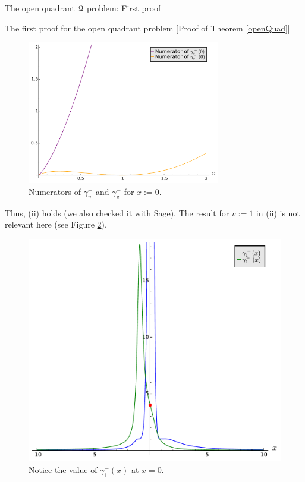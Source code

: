 \documentclass[11pt, a4paper, english, twoside, notitlepage, openright]{report}
\begin{document}
\begin{chapter}{The open quadrant $\mathcal{Q}$ problem: First proof}
\begin{section}{The first proof for the open quadrant problem} [Proof of Theorem \ref{openQuad}]
\begin{figure}[h]
\centering
\includegraphics[width=0.75\textwidth]{plots/ch1_08_numerators.pdf}
\caption{Numerators of $\gamma_v^+$ and $\gamma_v^-$ for $x:=0$.\label{fig:numerators}}
\end{figure}
			
Thus, (ii) holds (we also checked it with Sage). The result for $v:=1$ in (ii) is not relevant here (see Figure \ref{fig:limit}).
\begin{figure}[h]
\centering
\includegraphics[width=1\textwidth]{plots/ch1_09_limit.pdf}
\caption{Notice the value of $\gamma_1^-(x)$ at $x=0$.\label{fig:limit}}
\end{figure}


\end{section}
\end{chapter}
\end{document}
